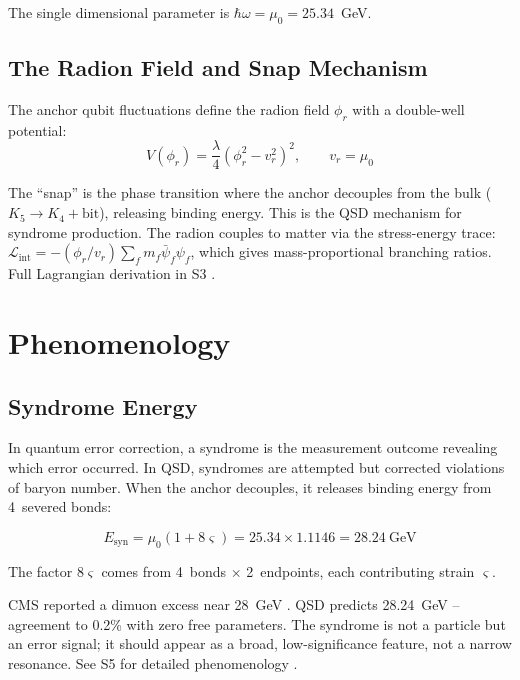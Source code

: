 \documentclass[11pt,a4paper]{article}
\theoremstyle{definition}
\newcommand{\strain}{\varsigma}
\newcommand{\Esyn}{E_{\text{syn}}}
\newcommand{\murad}{\mu_0}
\newcommand{\LL}{\mathcal{L}}
\begin{document}
The single dimensional parameter is $\hbar\omega = \murad = 25.34$~GeV.

\subsection{The Radion Field and Snap Mechanism}

The anchor qubit fluctuations define the radion field $\phi_r$ with a double-well potential:
\begin{equation}
V(\phi_r) = \frac{\lambda}{4}(\phi_r^2 - v_r^2)^2, \qquad v_r = \murad
\end{equation}

The ``snap'' is the phase transition where the anchor decouples from the bulk ($K_5 \to K_4 + \text{bit}$), releasing binding energy. This is the QSD mechanism for syndrome production. The radion couples to matter via the stress-energy trace: $\LL_{\text{int}} = -(\phi_r/v_r)\sum_f m_f \bar{\psi}_f \psi_f$, which gives mass-proportional branching ratios. Full Lagrangian derivation in S3 \cite{Hubka2026QSDsupp}.

\section{Phenomenology}
\label{sec:pheno}

\subsection{Syndrome Energy}

In quantum error correction, a syndrome is the measurement outcome revealing which error occurred. In QSD, syndromes are attempted but corrected violations of baryon number. When the anchor decouples, it releases binding energy from 4~severed bonds:

\begin{equation}
\Esyn = \murad(1 + 8\strain) = 25.34 \times 1.1146 = 28.24~\text{GeV}
\label{eq:syndrome}
\end{equation}

The factor $8\strain$ comes from 4~bonds $\times$ 2~endpoints, each contributing strain $\strain$.

CMS reported a dimuon excess near 28~GeV \cite{CMS2018dimuon}. QSD predicts 28.24~GeV -- agreement to 0.2\% with zero free parameters. The syndrome is not a particle but an error signal; it should appear as a broad, low-significance feature, not a narrow resonance. See S5 for detailed phenomenology \cite{Hubka2026QSDsupp}.
\end{document}
